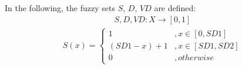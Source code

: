 In the following, the fuzzy sets $S$, $D$, $VD$ are defined:
\begin{align}
S, D, VD: X \rightarrow [0,1]
\end{align}
\begin{align}
S(x) = \left\{
     \begin{array}{lr}
       1 & , x \in [0, SD1]\\
       (SD1-x)+1 & , x \in [SD1, SD2]\\
       0 & , otherwise
     \end{array}
   \right.
\end{align}

